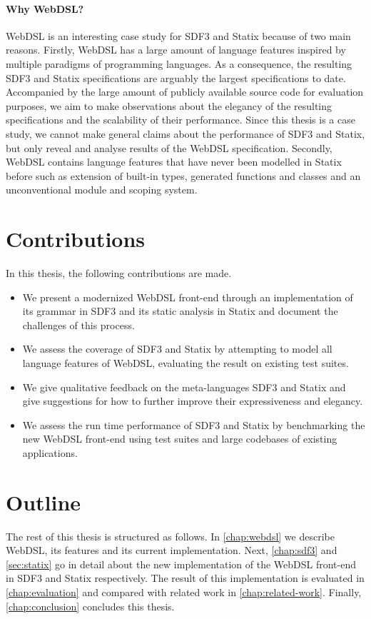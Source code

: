     \paragraph{Why WebDSL?} WebDSL is an interesting case study for SDF3 and Statix because of two main reasons. Firstly, WebDSL has a large amount of language features inspired by multiple paradigms of programming languages. As a consequence, the resulting SDF3 and Statix specifications are arguably the largest specifications to date. Accompanied by the large amount of publicly available source code for evaluation purposes, we aim to make observations about the elegancy of the resulting specifications and the scalability of their performance. Since this thesis is a case study, we cannot make general claims about the performance of SDF3 and Statix, but only reveal and analyse results of the WebDSL specification. Secondly, WebDSL contains language features that have never been modelled in Statix before such as extension of built-in types, generated functions and classes and an unconventional module and scoping system.

  \section{\label{sec:contributions}Contributions}

    In this thesis, the following contributions are made.

    \begin{itemize}
      \item We present a modernized WebDSL front-end through an implementation of its grammar in SDF3 and its static analysis in Statix and document the challenges of this process.
      \item We assess the coverage of SDF3 and Statix by attempting to model all language features of WebDSL, evaluating the result on existing test suites.
      \item We give qualitative feedback on the meta-languages SDF3 and Statix and give suggestions for how to further improve their expressiveness and elegancy.
      \item We assess the run time performance of SDF3 and Statix by benchmarking the new WebDSL front-end using test suites and large codebases of existing applications.
    \end{itemize}

  \section{\label{sec:outline}Outline}
    The rest of this thesis is structured as follows. In \cref{chap:webdsl} we describe WebDSL, its features and its current implementation. Next, \cref{chap:sdf3} and \cref{sec:statix} go in detail about the new implementation of the WebDSL front-end in SDF3 and Statix respectively. The result of this implementation is evaluated in \cref{chap:evaluation} and compared with related work in \cref{chap:related-work}. Finally, \cref{chap:conclusion} concludes this thesis.
